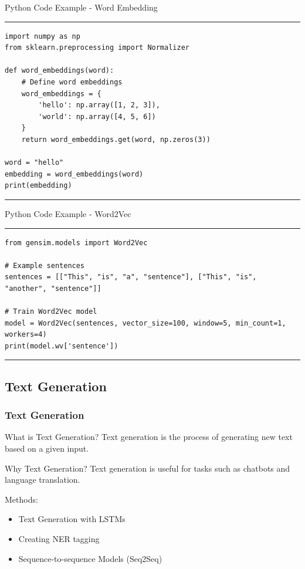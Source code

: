 \documentclass[aspectratio=169, hideothersubsections]{beamer}
\begin{document}
\begin{frame}[fragile]{Python Code Example - Word Embedding}
\rule{\textwidth}{1pt}
\scriptsize
\begin{verbatim}
import numpy as np
from sklearn.preprocessing import Normalizer

def word_embeddings(word):
    # Define word embeddings
    word_embeddings = {
        'hello': np.array([1, 2, 3]),
        'world': np.array([4, 5, 6])
    }
    return word_embeddings.get(word, np.zeros(3))

word = "hello"
embedding = word_embeddings(word)
print(embedding)
\end{verbatim}
\rule{\textwidth}{1pt}
\end{frame}

\begin{frame}[fragile]{Python Code Example - Word2Vec}
\rule{\textwidth}{1pt}
\scriptsize
\begin{verbatim}
from gensim.models import Word2Vec

# Example sentences
sentences = [["This", "is", "a", "sentence"], ["This", "is", "another", "sentence"]]

# Train Word2Vec model
model = Word2Vec(sentences, vector_size=100, window=5, min_count=1, workers=4)
print(model.wv['sentence'])
\end{verbatim}
\rule{\textwidth}{1pt}
\end{frame}

\subsection{Text Generation}

\begin{frame}
  \frametitle{Text Generation}
  \begin{block}{What is Text Generation?}
    Text generation is the process of generating new text based on a given input.
  \end{block}
  \begin{block}{Why Text Generation?}
    Text generation is useful for tasks such as chatbots and language translation.
  \end{block}
\begin{block}{Methods:}
\begin{itemize}
    \item Text Generation with LSTMs
    \item Creating NER tagging
    \item Sequence-to-sequence Models (Seq2Seq)
  \end{itemize}
\end{block}
\end{frame}
\end{document}
